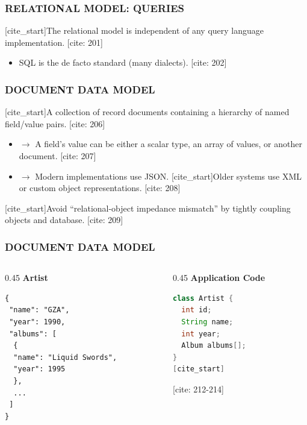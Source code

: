 \documentclass[aspectratio=169]{beamer}
\begin{document}
\begin{frame}
    \frametitle{RELATIONAL MODEL: QUERIES}
    [cite_start]The relational model is independent of any query language implementation. [cite: 201]
    \begin{itemize}
        [cite_start]\item SQL is the de facto standard (many dialects). [cite: 202]
    \end{itemize}
\end{frame}

\begin{frame}
    \frametitle{DOCUMENT DATA MODEL}
    [cite_start]A collection of record documents containing a hierarchy of named field/value pairs. [cite: 206]
    \begin{itemize}
        [cite_start]\item $\rightarrow$ A field’s value can be either a scalar type, an array of values, or another document. [cite: 207]
        \item $\rightarrow$ Modern implementations use JSON. [cite_start]Older systems use XML or custom object representations. [cite: 208]
    \end{itemize}
    [cite_start]Avoid ``relational-object impedance mismatch'' by tightly coupling objects and database. [cite: 209]
\end{frame}

\begin{frame}[fragile]
    \frametitle{DOCUMENT DATA MODEL}
    \begin{columns}
        \begin{column}{0.45\textwidth}
            \textbf{Artist}
\begin{lstlisting}
{
 "name": "GZA",
 "year": 1990,
 "albums": [
  {
  "name": "Liquid Swords",
  "year": 1995
  },
  ...
 ]
}
\end{lstlisting}
        \end{column}
        \begin{column}{0.45\textwidth}
            \textbf{Application Code}
\begin{lstlisting}[language=Java]
class Artist {
  int id;
  String name;
  int year;
  Album albums[];
}
[cite_start]\end{lstlisting} [cite: 212-214]
        \end{column}
    \end{columns}
\end{frame}
\end{document}
